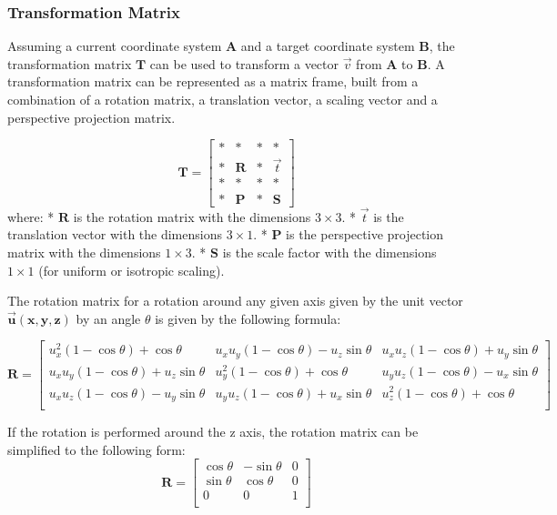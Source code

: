 \subsubsection{Transformation Matrix}

Assuming a current coordinate system $\mathbf{A}$ and a target coordinate system $\mathbf{B}$, the transformation matrix $\mathbf{T}$ can be used to transform a vector $\vec{v}$ from $\mathbf{A}$ to $\mathbf{B}$.
A transformation matrix can be represented as a matrix frame, built from a combination of a rotation matrix, a translation vector, a scaling vector and a perspective projection matrix.

$$
\mathbf{T} = \left[
\begin{array}{ccc|c}
\ast&\ast       &\ast&\ast\\
\ast&\mathbf{R} &\ast&\vec{t}  \\
\ast&\ast       &\ast&\ast\\
\hline
\ast&\mathbf{P} &\ast&\mathbf{S}
\end{array}
\right]
$$
where:  
* $\mathbf{R}$ is the rotation matrix with the dimensions $3\times 3$.  
* $\vec{t}$ is the translation vector with the dimensions $3\times 1$.  
* $\mathbf{P}$ is the perspective projection matrix with the dimensions $1\times 3$.  
* $\mathbf{S}$ is the scale factor with the dimensions $1\times 1$ (for uniform or isotropic scaling).

The rotation matrix for a rotation around any given axis given by the unit vector $\mathbf{\vec{u}(x,y,z)}$ by an angle $\theta$ is given by the following formula:

$$
\mathbf{R} =
\begin{bmatrix}
u_x^2(1-\cos\theta) + \cos\theta & u_xu_y(1-\cos\theta) - u_z\sin\theta & u_xu_z(1-\cos\theta) + u_y\sin\theta \\
u_xu_y(1-\cos\theta) + u_z\sin\theta & u_y^2(1-\cos\theta) + \cos\theta & u_yu_z(1-\cos\theta) - u_x\sin\theta \\
u_xu_z(1-\cos\theta) - u_y\sin\theta & u_yu_z(1-\cos\theta) + u_x\sin\theta & u_z^2(1-\cos\theta) + \cos\theta \\
\end{bmatrix}
$$

If the rotation is performed around the z axis, the rotation matrix can be simplified to the following form:
$$
\mathbf{R} =
\begin{bmatrix}
\cos\theta & -\sin\theta & 0 \\
\sin\theta & \cos\theta & 0 \\
0 & 0 & 1 \\
\end{bmatrix}
$$


